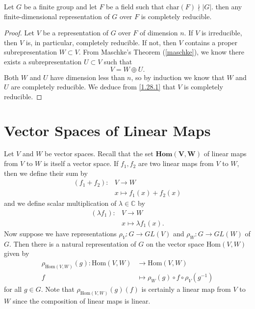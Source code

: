 \begin{cor}
Let $G$ be a finite group and let $F$ be a field such that $\text{char}(F) \nmid |G|$. then any finite-dimensional representation of $G$ over $F$ is completely reducible.
\end{cor}
\begin{proof}
Let $V$ be a representation of $G$ over $F$ of dimension $n$.  If $V$ is irreducible, then $V$ is, in particular, completely reducible.  If not, then $V$ contains a proper subrepresentation $W \subset V$.  From Maschke's Theorem (\ref{maschke}), we know there exists a subrepresentation $U \subset V$ such that 
\begin{equation} \label{1.28.1} V = W \oplus U. \end{equation}
Both $W$ and $U$ have dimension less than $n$, so by induction we know that $W$ and $U$ are completely reducible. We deduce from \ref{1.28.1} that $V$ is completely reducible.
\end{proof}

\section{Vector Spaces of Linear Maps}
\begin{defn}
Let $V$ and $W$ be vector spaces.  Recall that the set $\textbf{Hom}\mathbf{(V,W)}$ of linear maps from $V$ to $W$ is itself a vector space.  If $f_1, f_2$ are two linear maps from $V$ to $W$, then we define their sum by
\begin{align*}		
(f_1 + f_2) \colon &V \to W \\		
&x \mapsto f_1(x) + f_2(x)		
\end{align*}		
and we define scalar multiplication of $\lambda \in \mathbb{C}$ by		
\begin{align*}		
(\lambda f_1) \colon &V \to W \\		
&x \mapsto \lambda f_1(x).		
\end{align*}		
Now suppose we have representations $\rho_V \colon G \to GL(V)$ and $\rho_W \colon G \to GL(W)$ of $G$. Then there is a natural representation of $G$ on the vector space $\text{Hom}(V,W)$ given by
\begin{align*}		
 \rho_{\text{Hom}(V,W)}(g)  \colon \text{Hom}(V,W) &\to \text{Hom}(V,W) \\		
 f &\mapsto \rho_{W}(g) \circ f \circ \rho_{V}(g^{-1})
 \end{align*}		
for all $g \in G$. Note that $\rho_{\text{Hom}(V,W)}(g)(f)$ is certainly a linear map from $V$ to $W$ since the composition of linear maps is linear.
\end{defn}

